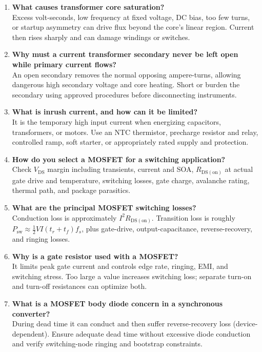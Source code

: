 \documentclass[11pt]{article}
\begin{document}
\begin{enumerate}
\item \textbf{What causes transformer core saturation?}\\
Excess volt-seconds, low frequency at fixed voltage, DC bias, too few turns, or startup asymmetry can drive flux beyond the core's linear region. Current then rises sharply and can damage windings or switches.

\item \textbf{Why must a current transformer secondary never be left open while primary current flows?}\\
An open secondary removes the normal opposing ampere-turns, allowing dangerous high secondary voltage and core heating. Short or burden the secondary using approved procedures before disconnecting instruments.

\item \textbf{What is inrush current, and how can it be limited?}\\
It is the temporary high input current when energizing capacitors, transformers, or motors. Use an NTC thermistor, precharge resistor and relay, controlled ramp, soft starter, or appropriately rated supply and protection.

\item \textbf{How do you select a MOSFET for a switching application?}\\
Check $V_\mathrm{DS}$ margin including transients, current and SOA, $R_\mathrm{DS(on)}$ at actual gate drive and temperature, switching losses, gate charge, avalanche rating, thermal path, and package parasitics.

\item \textbf{What are the principal MOSFET switching losses?}\\
Conduction loss is approximately $I^2R_\mathrm{DS(on)}$. Transition loss is roughly $P_\mathrm{sw}\approx\tfrac12VI(t_r+t_f)f_s$, plus gate-drive, output-capacitance, reverse-recovery, and ringing losses.

\item \textbf{Why is a gate resistor used with a MOSFET?}\\
It limits peak gate current and controls edge rate, ringing, EMI, and switching stress. Too large a value increases switching loss; separate turn-on and turn-off resistances can optimize both.

\item \textbf{What is a MOSFET body diode concern in a synchronous converter?}\\
During dead time it can conduct and then suffer reverse-recovery loss (device-dependent). Ensure adequate dead time without excessive diode conduction and verify switching-node ringing and bootstrap constraints.


\end{enumerate}
\end{document}
